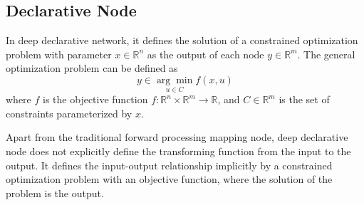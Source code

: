 \subsection{Declarative Node}
In deep declarative network, it defines the solution of a constrained optimization problem with parameter $x \in \mathbb{R}^n$ as the output of each node $y \in \mathbb{R}^m$. The general optimization problem can be defined as 
\begin{equation}
    \label{equ:ddn-basic}
    y \in \underset{u \in C}{\arg \min } f(x, u)
\end{equation}
where $f$ is the objective function $f: \mathbb{R}^n \times \mathbb{R}^m \rightarrow \mathbb{R}$, and $C \in \mathbb{R}^m$ is the set of constraints parameterized by $x$. 
\par Apart from the traditional forward processing mapping node, deep declarative node does not explicitly define the transforming function from the input to the output. It defines the input-output relationship implicitly by a constrained optimization problem with an objective function, where the solution of the problem is the output. 
